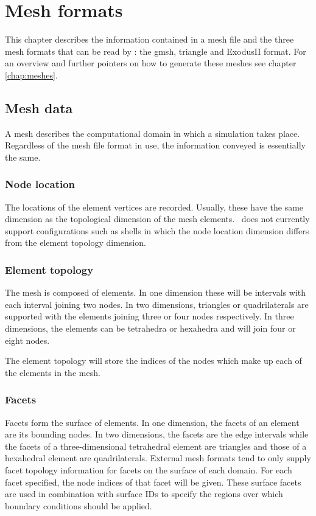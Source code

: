 \chapter{Mesh formats}\label{chap:mesh_formats}

This chapter describes the information contained in a mesh file and the 
three mesh formats that can be read by \fluidity: the gmsh, triangle and 
ExodusII format.
For an overview and further pointers on how to generate these meshes
see chapter \ref{chap:meshes}.

\section{Mesh data}

A mesh describes the computational domain in which a simulation takes
place. Regardless of the mesh file format in use, the information conveyed
is essentially the same.

\subsection{Node location}

The locations of the element vertices are recorded. Usually, these have the
same dimension as the topological dimension of the mesh elements. \fluidity\
does not currently support configurations such as shells in which the node
location dimension differs from the element topology dimension.

\subsection{Element topology}

The mesh is composed of elements. In one dimension these will be intervals
with each interval joining two nodes. In two dimensions, triangles or
quadrilaterals are supported with the elements joining three or four nodes
respectively. In three dimensions, the elements can be tetrahedra or
hexahedra and will join four or eight nodes.

The element topology will store the indices of the nodes which make up
each of the elements in the mesh.

\subsection{Facets}

Facets form the surface of elements. In one dimension, the facets of an
element are its bounding nodes. In two dimensions, the facets are the edge
intervals while the facets of a three-dimensional tetrahedral element are
triangles and those of a hexahedral element are quadrilaterals. External
mesh formats tend to only supply facet topology information for facets on
the surface of each domain. For each facet specified, the node indices of
that facet will be given. These surface facets are used in combination with
surface IDs to specify the regions over which boundary conditions should be
applied.

